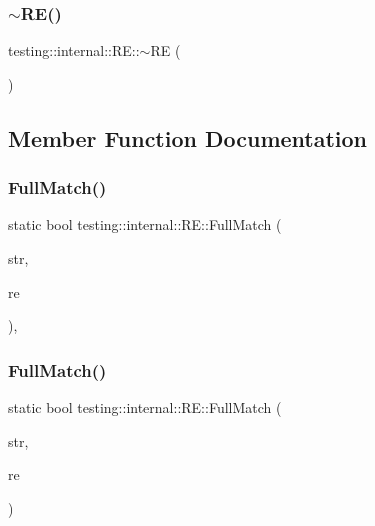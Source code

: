 \mbox{\label{classtesting_1_1internal_1_1_r_e_af3ad18e6c0b433f3d85ed23eda8119f3}} 
\subsubsection{\texorpdfstring{$\sim$RE()}{~RE()}}
{\footnotesize\ttfamily testing\+::internal\+::\+R\+E\+::$\sim$\+RE (\begin{DoxyParamCaption}{ }\end{DoxyParamCaption})}



\subsection{Member Function Documentation}
\mbox{\label{classtesting_1_1internal_1_1_r_e_aa79a950758d0f1d62f7762d1e9cefe86}} 
\subsubsection{\texorpdfstring{FullMatch()}{FullMatch()}\hspace{0.1cm}{\footnotesize\ttfamily [1/2]}}
{\footnotesize\ttfamily static bool testing\+::internal\+::\+R\+E\+::\+Full\+Match (\begin{DoxyParamCaption}\item[{const \+::std\+::string \&}]{str,  }\item[{const \mbox{\hyperlink{classtesting_1_1internal_1_1_r_e}{RE}} \&}]{re }\end{DoxyParamCaption})\hspace{0.3cm}{\ttfamily [inline]}, {\ttfamily [static]}}

\mbox{\label{classtesting_1_1internal_1_1_r_e_a2b13ec1f6ccd6c32f7efa01e21588f0b}} 
\subsubsection{\texorpdfstring{FullMatch()}{FullMatch()}\hspace{0.1cm}{\footnotesize\ttfamily [2/2]}}
{\footnotesize\ttfamily static bool testing\+::internal\+::\+R\+E\+::\+Full\+Match (\begin{DoxyParamCaption}\item[{const char $\ast$}]{str,  }\item[{const \mbox{\hyperlink{classtesting_1_1internal_1_1_r_e}{RE}} \&}]{re }\end{DoxyParamCaption})\hspace{0.3cm}{\ttfamily [static]}}

